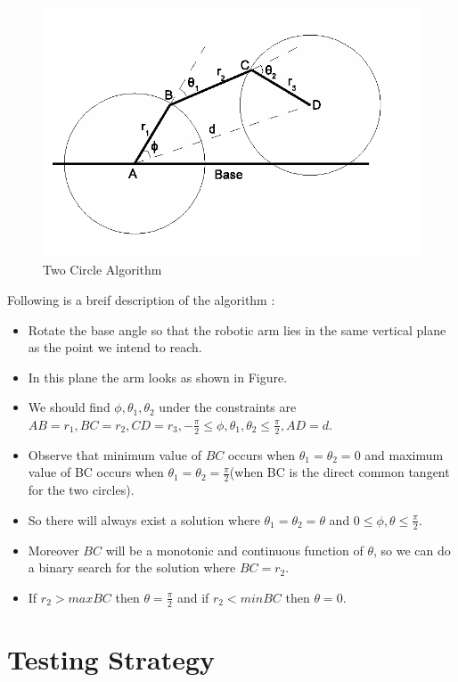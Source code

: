 \documentclass[a4paper,11pt]{article}
\begin{document}
\begin{figure}[htp]
\centering
\includegraphics[scale=0.6]{images/two-circle.png}
\caption{Two Circle Algorithm}
\end{figure}

Following is a breif description of the algorithm :
 
  \begin{itemize}
  \item Rotate the base angle so that the robotic arm lies in the same vertical plane as the point we intend to reach.
  \item In this plane the arm looks as shown in Figure.
  \item We should find $\phi,\theta_1,\theta_2$ under the constraints are $AB=r_1,BC=r_2,CD=r_3,-\frac{\pi}{2}\le\phi,\theta_1,\theta_2\le\frac{\pi}{2},AD=d$.
  \item Observe that minimum value of $BC$ occurs when $\theta_1=\theta_2=0$ and maximum value of BC occurs when $\theta_1=\theta_2=\frac{\pi}{2}$(when BC is the direct common tangent for the two circles).
  \item So there will always exist a solution where $\theta_1=\theta_2=\theta$ and $0\le\phi,\theta\le\frac{\pi}{2}$.
  \item Moreover $BC$ will be a monotonic and continuous function of $\theta$, so we can do a binary search for the solution where $BC=r_2$.
  \item If $r_2>max BC$ then $\theta=\frac{\pi}{2}$ and if $r_2<min BC$ then $\theta=0$.
  \end{itemize}
  



\section{Testing Strategy}
\end{document}
